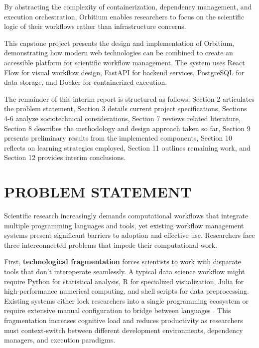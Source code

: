 \documentclass[12pt]{article}
\begin{document}
\hspace{\parindent}By abstracting the complexity of containerization, dependency management, and execution orchestration, Orbitium enables researchers to focus on the scientific logic of their workflows rather than infrastructure concerns.

\hspace{\parindent}This capstone project presents the design and implementation of Orbitium, demonstrating how modern web technologies can be combined to create an accessible platform for scientific workflow management. The system uses React Flow for visual workflow design, FastAPI for backend services, PostgreSQL for data storage, and Docker for containerized execution.

\hspace{\parindent}The remainder of this interim report is structured as follows: Section 2 articulates the problem statement, Section 3 details current project specifications, Sections 4-6 analyze sociotechnical considerations, Section 7 reviews related literature, Section 8 describes the methodology and design approach taken so far, Section 9 presents preliminary results from the implemented components, Section 10 reflects on learning strategies employed, Section 11 outlines remaining work, and Section 12 provides interim conclusions.

\newpage
\section{PROBLEM STATEMENT}

\hspace{\parindent}Scientific research increasingly demands computational workflows that integrate multiple programming languages and tools, yet existing workflow management systems present significant barriers to adoption and effective use. Researchers face three interconnected problems that impede their computational work.

\hspace{\parindent}First, \textbf{technological fragmentation} forces scientists to work with disparate tools that don't interoperate seamlessly. A typical data science workflow might require Python for statistical analysis, R for specialized visualization, Julia for high-performance numerical computing, and shell scripts for data preprocessing. Existing systems either lock researchers into a single programming ecosystem or require extensive manual configuration to bridge between languages \cite{perkel2019workflow}. This fragmentation increases cognitive load and reduces productivity as researchers must context-switch between different development environments, dependency managers, and execution paradigms.
\end{document}
